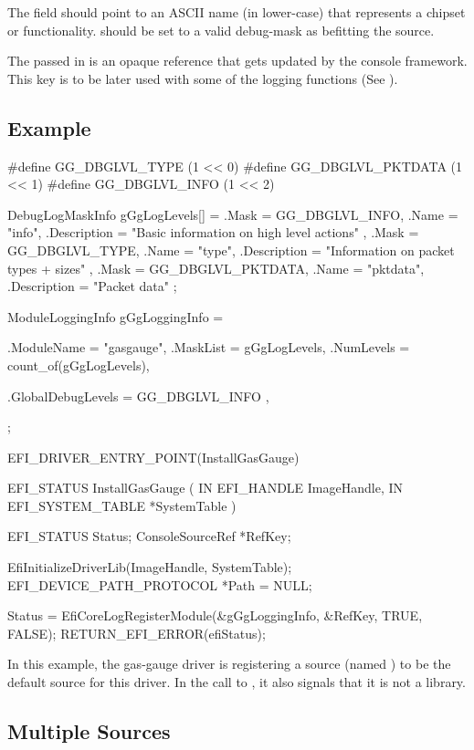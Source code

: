 The  field should point to an ASCII name (in lower-case) that represents a chipset or functionality.  should be set to a valid debug-mask as befitting the source. 

The 
passed in is an opaque reference that gets updated by the console framework. This key is to be later used with some of the logging functions (See ).

\subsection{Example}

\begin{SampleCode}
#define GG_DBGLVL_TYPE           (1 << 0)
#define GG_DBGLVL_PKTDATA        (1 << 1)
#define GG_DBGLVL_INFO           (1 << 2)

DebugLogMaskInfo gGgLogLevels[] = {
    {
        .Mask = GG_DBGLVL_INFO,
        .Name = "info",
        .Description = "Basic information on high level actions"
    },
    {
        .Mask = GG_DBGLVL_TYPE,
        .Name = "type",
        .Description = "Information on packet types + sizes"
    },
    {
        .Mask = GG_DBGLVL_PKTDATA,
        .Name = "pktdata",
        .Description = "Packet data"
    }
};

ModuleLoggingInfo gGgLoggingInfo = {
    .ModuleName = "gasgauge",
    .MaskList = gGgLogLevels,
    .NumLevels = count_of(gGgLogLevels),

    .GlobalDebugLevels = {
        GG_DBGLVL_INFO
    },
};

EFI_DRIVER_ENTRY_POINT(InstallGasGauge)

EFI_STATUS
InstallGasGauge (
		IN EFI_HANDLE		ImageHandle,
		IN EFI_SYSTEM_TABLE	*SystemTable
		)
{
	EFI_STATUS Status;
    ConsoleSourceRef *RefKey;

	EfiInitializeDriverLib(ImageHandle, SystemTable);
	EFI_DEVICE_PATH_PROTOCOL *Path = NULL;

    Status = EfiCoreLogRegisterModule(&gGgLoggingInfo, &RefKey, TRUE, FALSE);
    RETURN_EFI_ERROR(efiStatus);
}
\end{SampleCode}

In this example, the gas-gauge driver is registering a source (named ) to be the default 
source for this driver. In the call to , it also signals that it is
not a library.

\subsection{Multiple Sources}

